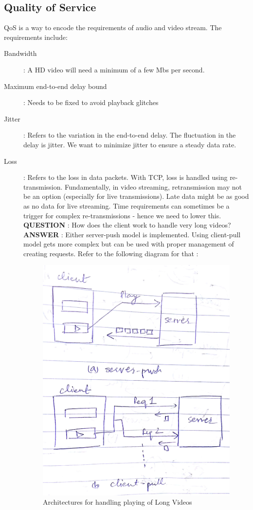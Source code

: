 \documentclass[twoside]{article}
\begin{document}
\subsection{Quality of Service}
QoS is a way to encode the requirements of audio and video stream. The requirements include:
\begin{description}
\item[Bandwidth]: A HD video will need a minimum of a few Mbs per second.
\item[Maximum end-to-end delay bound]: Needs to be fixed to avoid playback glitches
\item[Jitter]: Refers to the variation in the end-to-end delay. The fluctuation in the delay is jitter. We want to minimize jitter to ensure a steady data rate.
\item[Loss]: Refers to the loss in data packets. With TCP, loss is handled using re-transmission. Fundamentally, in video streaming, retransmission may not be an option (especially for live transmissions). Late data might be as good as no data for live streaming. Time requirements can sometimes be a trigger for complex re-transmissions - hence we need to lower this.
\\
\textbf{QUESTION} : How does the client work to handle very long videos? \\
\textbf{ANSWER} : Either server-push model is implemented. Using client-pull model gets more complex but can be used with proper management of creating requests. Refer to the following diagram for that : 
\begin{figure}[h!]
\includegraphics[scale=0.15]{Class_Diagram_1}
\centering
\caption{Architectures for handling playing of Long Videos}
\end{figure}


\end{description}
\end{document}
